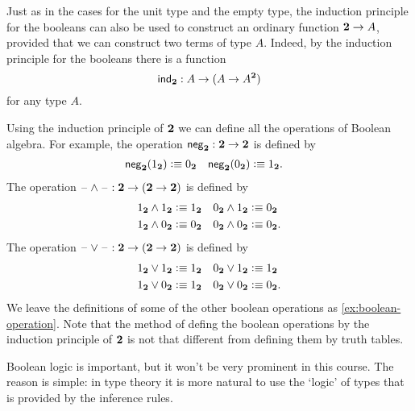 Just as in the cases for the unit type and the empty type, the induction principle for the booleans can also be used to construct an ordinary function $\bool\to A$, provided that we can construct two terms of type $A$. Indeed, by the induction principle for the booleans there is a function
\begin{equation*}
  \indbool : A \to (A\to A^\bool)
\end{equation*}
for any type $A$.

\begin{eg}\label{eg:boolean-ops}
  Using the induction principle of $\bool$ we can define all the operations of Boolean algebra. For example, the  operation $\negbool : \bool \to \bool$ is defined by
  \begin{align*}
    \negbool(\btrue) & \defeq \bfalse & \negbool(\bfalse) & \defeq \btrue.
  \end{align*}
  The  operation $\blank\land\blank : \bool \to (\bool\to \bool)$ is defined by
  \begin{align*}
    \btrue\land\btrue & \defeq \btrue & \bfalse\land\btrue & \defeq \bfalse \\
    \btrue\land\bfalse & \defeq \bfalse & \bfalse\land\bfalse & \defeq \bfalse.
  \end{align*}
  The  operation $\blank\lor\blank : \bool \to (\bool\to \bool)$ is defined by
  \begin{align*}
    \btrue\lor\btrue & \defeq \btrue & \bfalse\lor\btrue & \defeq \btrue \\
    \btrue\lor\bfalse & \defeq \btrue & \bfalse\lor\bfalse & \defeq \bfalse.
  \end{align*}  
  We leave the definitions of some of the other boolean operations as \cref{ex:boolean-operation}. Note that the method of defing the boolean operations by the induction principle of $\bool$ is not that different from defining them by truth tables.

  Boolean logic is important, but it won't be very prominent in this course. The reason is simple: in type theory it is more natural to use the `logic' of types that is provided by the inference rules.
\end{eg}

